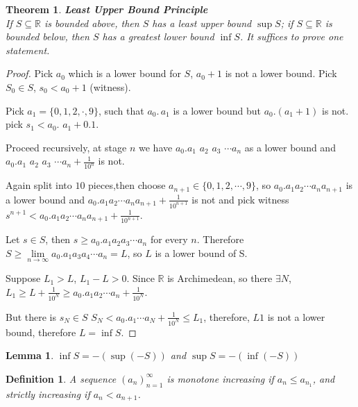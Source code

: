 \documentclass[12pt]{article}
\theoremstyle{plain}
\newtheorem{theorem}{Theorem}[subsection]
\newtheorem{definition}{Definition}[subsection]
\newtheorem{lemma}{Lemma}[subsection]
\newcommand{\dlim}{\displaystyle\lim\limits}
\begin{document}
    {\color{Blue}
    \begin{theorem}\textbf{Least Upper Bound Principle}\\
        If $S \subseteq \mathbb{R}$ is bounded above, then $S$ has a least 
        upper bound $\sup S$; if $S \subseteq \mathbb{R}$ is bounded below, 
        then $S$ has a greatest lower bound $\inf S$.
        It suffices to prove one statement.
    \end{theorem}
    \begin{proof}
    	Pick $a_0 $ which is a lower bound for $S$, $a_0+1$ is not a lower bound.
        Pick $S_0 \in S$, $s_0 < a_0+1$ (witness).

        Pick $a_1 = \{0, 1, 2, \cdot , 9\}$, such that $a_0.\,a_1$ is a lower bound but
        $a_0. (a_1+1)$ is not. pick $s_1<a_0.\,\, a_1+0.1$.

        Proceed recursively, at stage $n$ we have $a_0. a_1\,\,a_2\,\,a_3\,\,\cdots a_n$
        as a lower bound and $a_0. a_1\,\,a_2\,\,a_3\,\,\cdots a_n + \frac1{10^n}$ is not.
        
        Again split into $10$ pieces,then choose $a_{n+1} \in \{0, 1, 2, \cdots, 9\}$, 
        so $a_0. a_1  a_2  \cdots a_n a_{n+1}$ is a lower bound
         and $a_0. a_1a_2\cdots a_n a_{n+1}+\frac1{10^{n+1}}$ is not
        and pick witness $s^{n+1} < a_0. a_1a_2\cdots a_na_{n+1}+\frac1{10^{n+1}}$.

        Let $s\in S$, then $s\geq a_0. a_1 a_2 a_3\cdots a_n$ for every $n$.
        Therefore $S \geq \dlim_{n\to\infty} a_0. a_1 a_3 a_4 \cdots a_n = L$, 
        so $L$ is a lower bound of S. 

        Suppose $L_1 > L$, $L_1 - L >0$. Since $\mathbb{R}$ is Archimedean, so 
        there $\exists N$, $L_1 \geq L+\frac1{10^N}\geq a_0.a_1a_2\cdots a_n+\frac1{10^N}$.

        But there is $s_N \in S$ $S_N< a_0. a_1\cdots a_N+\frac1{10^N} \leq L_1$,
        therefore, $L1$ is not a lower bound, therefore $L=\inf S$.
    \end{proof}}

    \begin{lemma}
        $\inf S = -(\sup (-S))$ \quad and \quad $\sup S = -(\inf (-S))$
    \end{lemma}

    \begin{definition}
        A sequence $(a_n)_{n=1}^{\infty}$ is monotone increasing if 
        $a_n\leq a_{n_1}$, and strictly increasing if $a_n<a_{n+1}$.
    \end{definition}
\end{document}
